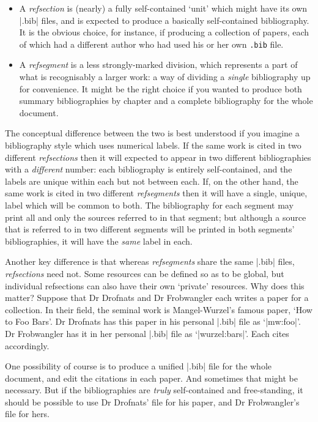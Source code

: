 \begin{itemize}
\item
  A \emph{refsection} is (nearly) a fully self-contained `unit' which
  might have its own |.bib| files, and is expected to produce a basically
  self-contained bibliography. It is the obvious choice, for
  instance, if producing a collection of papers, each of which had a
  different author who had used his or her own \texttt{.bib} file.
\item A \emph{refsegment} is a less strongly-marked division, which
  represents a part of what is recognisably a larger work: a way of
  dividing a \emph{single} bibliography up for convenience. It might
  be the right choice if you wanted to produce both summary
  bibliographies by chapter and a complete bibliography for the whole
  document.
\end{itemize}
The conceptual difference between the two is best understood if you
imagine a bibliography style which uses numerical labels. If the same
work is cited in two different \emph{refsections} then it will
expected to appear in two different bibliographies with a
\emph{different} number: each bibliography is entirely self-contained,
and the labels are unique within each but not between each. If, on the
other hand, the same work is cited in two different \emph{refsegments}
then it will have a single, unique, label which will be common to both.
The bibliography for each segment may print all and only the sources
referred to in that segment; but although a source that is referred to
in two different segments will be printed in both segments'
bibliographies, it will have the \emph{same} label in each.

Another key difference is that whereas \emph{refsegments} share the
same |.bib| files, \emph{refsections} need not.  Some resources can be
defined so as to be global, but individual refsections can also have
their own `private' resources. Why does this matter? Suppose
that Dr Drofnats and Dr Frobwangler each writes a paper for a
collection. In their field, the seminal work is Mangel-Wurzel's famous
paper, `How to Foo Bars'. Dr Drofnats has this paper in his personal
|.bib| file as `|mw:foo|'. Dr Frobwangler has it in her personal |.bib|
file as `|wurzel:bars|'. Each cites accordingly.

One possibility of course is to produce a unified |.bib| file for the
whole document, and edit the citations in each paper. And sometimes that
might be necessary. But if the bibliographies are \emph{truly}
self-contained and free-standing, it should be possible to use Dr
Drofnats' file for his paper, and Dr Frobwangler's file for hers.

